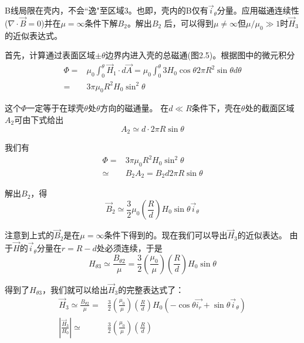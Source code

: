 B线局限在壳内，不会``逸"至区域3。也即，壳内的B仅有$\vec{i}_\theta$分量。应用磁通连续性($\nabla \cdot \vec{B}=0$)并在$\mu=\infty$条件下解$B_2$。解出$B_2$
后，可以得到$\mu \neq \infty$但$\mu/\mu_0 \gg 1$时$\vec{H}_3$的近似表达式。

首先，计算通过表面区域$\pm \theta$边界内进入壳的总磁通(图2.5)。根据图中的微元积分
\begin{align}
\Phi=&\mu_0\int_{0}^{\theta} \vec{H}_1 \cdot d\vec{A}=\mu_0\int_{0}^{\theta} 3H_0\cos\theta 2\pi R^2 \sin\theta d\theta\nonumber\\
=&3\pi\mu_0 R^2 H_0 \sin^2 \theta\nonumber \tag{S3.11}
\end{align}


这个$\Phi$一定等于在球壳$\theta$处$\theta$方向的磁通量。
在$d\ll R$条件下，壳在$\theta$处的截面区域$A_2$可由下式给出
\begin{equation*}
A_2\simeq d\cdot 2\pi R\sin\theta \tag{S3.12}
\end{equation*}

我们有
\begin{align}
\Phi=&3\pi\mu_0 R^2 H_0 \sin^2 \theta\nonumber\\
\simeq& B_2 A_2=B_2 d 2 \pi R \sin\theta \tag{S3.13}
\end{align}

解出$B_2$，得
\begin{equation*}
\vec{B}_2\simeq \frac{3}{2}\mu_0 \left(\frac{R}{d}\right) H_0\sin\theta\vec{i}_\theta \tag{S3.14}
\end{equation*}

注意到上式的$\vec{B}_2$是在$\mu=\infty$条件下得到的。现在我们可以导出$\vec{H}_3$的近似表达。
由于$\vec{H}$的$\vec{i}_\theta$分量在$r=R-d$处必须连续，于是
\begin{equation*}
H_{\theta 3}\simeq \frac{B_{\theta 2}}{\mu}=\frac{3}{2}\left(\frac{\mu_0}{\mu}\right)\left(\frac{R}{d}\right)H_0\sin\theta \tag{S3.15}
\end{equation*}

得到了$H_{\theta 3}$，我们就可以给出$\vec{H}_3$的完整表达式了：
\begin{align}
\vec{H}_3\simeq \frac{B_{\theta 2}}{\mu}=&\frac{3}{2}\left(\frac{\mu_0}{\mu}\right)\left(\frac{R}{d}\right)H_0(-\cos\theta\vec{i_r}+\sin\theta\vec{i}_\theta) \nonumber\tag{S3.16a}\\
\left|\frac{\vec{H}_3}{H_0}\right|\simeq& \frac{3}{2}\left(\frac{\mu_0}{\mu}\right)\left(\frac{R}{d}\right) \nonumber\tag{S3.16b}
\end{align}

